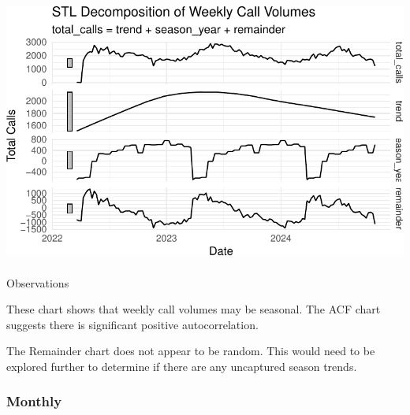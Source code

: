 \documentclass[
  letterpaper,
  DIV=11,
  numbers=noendperiod]{scrartcl}
\makeatletter
\let\oldparagraph\paragraph
\renewcommand{\paragraph}{
    \@ifstar
      \xxxParagraphStar
      \xxxParagraphNoStar
  }
\newcommand{\xxxParagraphStar}[1]{\oldparagraph*{#1}\mbox{}}
\newcommand{\xxxParagraphNoStar}[1]{\oldparagraph{#1}\mbox{}}
\makeatother
\begin{document}
\includegraphics{final_proj_group1_files/figure-pdf/weekly-3.pdf}

\paragraph{Observations}\label{observations-6}

These chart shows that weekly call volumes may be seasonal. The ACF
chart suggests there is significant positive autocorrelation.

The Remainder chart does not appear to be random. This would need to be
explored further to determine if there are any uncaptured season trends.

\subsubsection{Monthly}\label{monthly}
\end{document}
